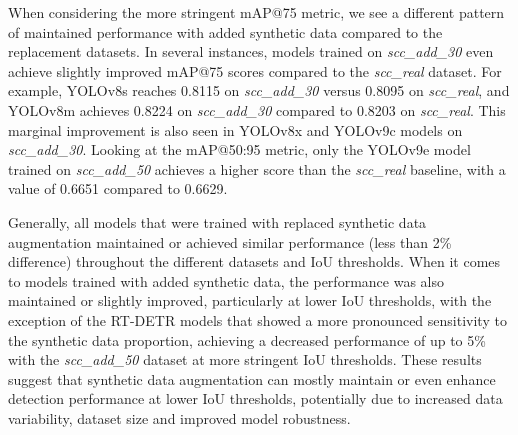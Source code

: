 When considering the more stringent mAP@75 metric, we see a different pattern of maintained performance with added synthetic data compared to the replacement datasets.
In several instances, models trained on \textit{scc\_add\_30} even achieve slightly improved mAP@75 scores compared to the \textit{scc\_real} dataset.
For example, YOLOv8s reaches 0.8115 on \textit{scc\_add\_30} versus 0.8095 on \textit{scc\_real}, and YOLOv8m achieves 0.8224 on \textit{scc\_add\_30} compared to 0.8203 on \textit{scc\_real}.
This marginal improvement is also seen in YOLOv8x and YOLOv9c models on \textit{scc\_add\_30}.
Looking at the mAP@50:95 metric, only the YOLOv9e model trained on \textit{scc\_add\_50} achieves a higher score than the \textit{scc\_real} baseline, with a value of 0.6651 compared to 0.6629.

Generally, all models that were trained with replaced synthetic data augmentation maintained or achieved similar performance (less than 2\% difference) throughout the different datasets and IoU thresholds.
When it comes to models trained with added synthetic data, the performance was also maintained or slightly improved, particularly at lower IoU thresholds, with the exception of the RT-DETR models that showed a more pronounced sensitivity to the synthetic data proportion, achieving a
decreased performance of up to 5\% with the \textit{scc\_add\_50} dataset at more stringent IoU thresholds.
These results suggest that synthetic data augmentation can mostly maintain or even enhance detection performance at lower IoU thresholds, potentially due to increased data variability, dataset size and improved model robustness.

